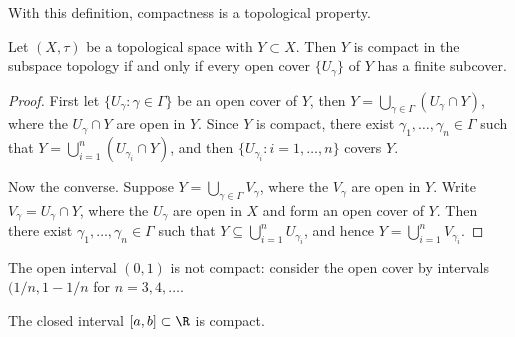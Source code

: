 With this definition, compactness is a topological property.

\begin{lemma}
	Let $(X,\tau)$ be a topological space with $Y\subset X$. Then $Y$ is compact in the subspace topology if and only if every open cover $\{U_\gamma\}$ of $Y$ has a finite subcover.
\end{lemma}

\begin{proof}
	First let $\{U_\gamma:\gamma \in \Gamma\}$ be an open cover of $Y$, then $Y = \bigcup_{\gamma\in\Gamma} (U_\gamma \cap Y)$, where the $U_\gamma \cap Y$ are open in $Y$. Since $Y$ is compact, there exist $\gamma_1,\ldots,\gamma_n \in \Gamma$ such that $Y=\bigcup_{i=1}^n (U_{\gamma_i}\cap Y)$, and then $\{U_{\gamma_i}: i=1,\ldots,n\}$ covers $Y$.

	Now the converse. Suppose $Y=\bigcup_{\gamma\in\Gamma} V_\gamma$, where the $V_\gamma$ are open in $Y$. Write $V_\gamma = U_\gamma \cap Y$, where the $U_\gamma$ are open in $X$ and form an open cover of $Y$. Then there exist $\gamma_1,\ldots,\gamma_n \in \Gamma$ such that $Y \subseteq \bigcup_{i=1}^n U_{\gamma_i}$, and hence $Y=\bigcup_{i=1}^n V_{\gamma_i}$.
\end{proof}

\begin{example}
	The open interval $(0,1)$ is not compact: consider the open cover by intervals $(1/n,1-1/n$ for $n=3,4,\ldots$.
\end{example}

	\pagebreak

\begin{theorem}
	 The closed interval $[a,b] \subset \R$ is compact.
\end{theorem}

